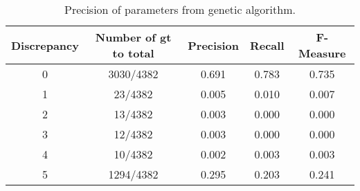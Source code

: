 \begin{table}[H]
\begin{center}
\begin{tabular}{|c|c|ccc|}
\hline
Discrepancy & Number of gt to total & Precision & Recall & F-Measure\\ 
\hline
0&   3030/4382&   0.691&    0.783&    0.735\\ 
1&   23/4382&     0.005&    0.010&    0.007\\ 
2&   13/4382&     0.003&    0.000&    0.000\\ 
3&   12/4382&     0.003&    0.000&    0.000\\ 
4&   10/4382&     0.002&    0.003&    0.003\\ 
5&   1294/4382&   0.295&    0.203&    0.241\\
\hline
\end{tabular}
\end{center}
\caption{Precision of parameters from genetic algorithm.}
\label{tab:geneticparametersresults}
\end{table}








